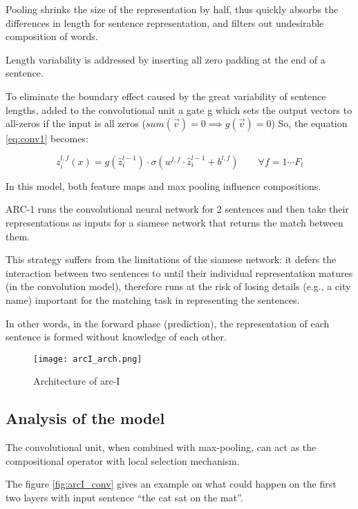 Pooling shrinks the size of the representation by half, thus quickly
absorbs the differences in length for sentence representation, and filters out
undesirable composition of words.

Length variability is addressed by inserting all zero padding at the end of
a sentence.

To eliminate the boundary effect caused
by the great variability of sentence lengths, \cite{arc} added to the
convolutional unit a gate g which sets the output vectors to all-zeros if the
input is all zeros ($sum(\vec{v}) = 0 \implies g(\vec{v}) = 0$)
So, the equation \ref{eq:conv1} becomes:

\begin{equation}
\tag{Convolution / output for a filter in ARC-I with ``zero gate''}
\label{eq:conv2}
z_i^{l,f} (x) = g(\hat{z}_i^{l-1}) \cdot \sigma(w^{l,f} \cdot
\hat{z}_i^{l-1} + b^{l,f}) \qquad \forall f = 1 \cdots F_l
\end{equation}

In this model, both feature maps and max pooling influence compositions.

ARC-1 runs the convolutional neural network for 2 sentences and then take
their representations as inputs for a siamese network that returns the match
between them.

This strategy suffers from the limitations of the siamese network:
it defers the interaction between two sentences to until their individual
representation matures (in the convolution model), therefore runs at the risk
of losing details (e.g., a city name) important for the matching task in
representing the sentences.

In other words, in the forward phase (prediction), the representation of each
sentence is formed without knowledge of each other.

\begin{figure}[H]
  \centering
  \texttt{[image: arcI\_arch.png]}
  \caption{Architecture of arc-I}
  \label{fig:arcI_arch}
\end{figure}

\subsection{Analysis of the model}

The convolutional unit, when combined with max-pooling, can act as
the compositional operator with local selection mechanism.

The figure \ref{fig:arcI_conv} gives an example on what could happen on the first
two layers with input sentence ``the cat sat on the mat''.

